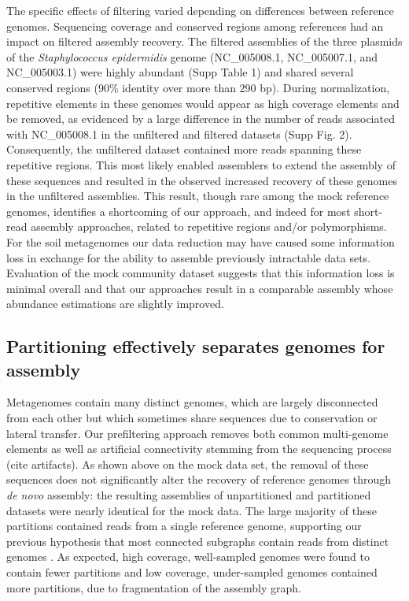 \documentclass[11pt]{article} %
\begin{document}
The specific effects of filtering varied depending on differences
between reference genomes.  Sequencing coverage and conserved regions
among references had an impact on filtered assembly recovery.  The
filtered assemblies of the three plasmids of the \emph{Staphylococcus
  epidermidis} genome (NC\_005008.1, NC\_005007.1, and NC\_005003.1)
were highly abundant (Supp Table 1) and shared several conserved
regions (90\% identity over more than 290 bp).  During normalization,
repetitive elements in these genomes would appear as high coverage
elements and be removed, as evidenced by a large difference in the
number of reads associated with NC\_005008.1 in the unfiltered and
filtered datasets (Supp Fig. 2). Consequently, the unfiltered dataset
contained more reads spanning these repetitive regions.  This most
likely enabled assemblers to extend the assembly of these sequences
and resulted in the observed increased recovery of these genomes in
the unfiltered assemblies. This result, though rare among the mock
reference genomes, identifies a shortcoming of our approach, and
indeed for most short-read assembly approaches, related to repetitive
regions and/or polymorphisms.  For the soil metagenomes our data
reduction may have caused some information loss in exchange for the
ability to assemble previously intractable data sets.  Evaluation of
the mock community dataset suggests that this information loss is
minimal overall and that our approaches result in a comparable
assembly whose abundance estimations are slightly improved.

\subsection{Partitioning effectively separates genomes for assembly}

Metagenomes contain many distinct genomes, which are largely
disconnected from each other but which sometimes share sequences due
to conservation or lateral transfer.  Our prefiltering approach
removes both common multi-genome elements as well as artificial
connectivity stemming from the sequencing process (cite artifacts).
As shown above on the mock data set, the removal of these sequences
does not significantly alter the recovery of reference genomes through
{\em de novo} assembly: the resulting assemblies of unpartitioned and
partitioned datasets were nearly identical for the mock data.  The
large majority of these partitions contained reads from a single
reference genome, supporting our previous hypothesis that most
connected subgraphs contain reads from distinct genomes
\cite{Pell:2012cq}.  As expected, high coverage, well-sampled genomes
were found to contain fewer partitions and low coverage, under-sampled
genomes contained more partitions, due to fragmentation of the
assembly graph.
\end{document}
